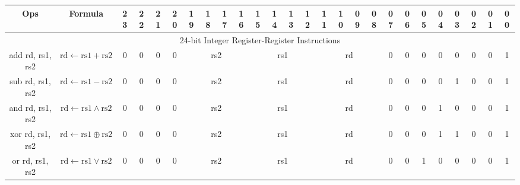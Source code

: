 \documentclass[a4paper,10pt]{article}
\begin{document}
\begin{landscape}\begin{longtable}[c]{|c|c|@{}c@{}|@{}c@{}|@{}c@{}|@{}c@{}|@{}c@{}|@{}c@{}|@{}c@{}|@{}c@{}|@{}c@{}|@{}c@{}|@{}c@{}|@{}c@{}|@{}c@{}|@{}c@{}|@{}c@{}|@{}c@{}|@{}c@{}|@{}c@{}|@{}c@{}|@{}c@{}|@{}c@{}|@{}c@{}|@{}c@{}|@{}c@{}|}\hline
Ops                   & Formula                                                            & 23  & 22  & 21  & 20  & 19      & 18      & 17     & 16    & 15       & 14     & 13     & 12    & 11     & 10   & 09    & 08    & 07                & 06                & 05   & 04   & 03   & 02 & 01 & 00 \\\hline


\hline
\multicolumn{26}{|c|}{24-bit Integer Register-Register Instructions}                                                                                                                                                                                                                                                             \\\hline
add rd, rs1, rs2      & $\mathrm{rd} \leftarrow \mathrm{rs1} + \mathrm{rs2}$ & 0 & 0 & 0 & 0 & \multicolumn{4}{c|}{rs2}            & \multicolumn{4}{c|}{rs1}            & \multicolumn{4}{c|}{rd}      & 0              & 0                & 0   & 0   & 0   & 0 & 0 & 1 \\
sub rd, rs1, rs2      & $\mathrm{rd} \leftarrow \mathrm{rs1} - \mathrm{rs2}$ & 0 & 0 & 0 & 0 & \multicolumn{4}{c|}{rs2}            & \multicolumn{4}{c|}{rs1}            & \multicolumn{4}{c|}{rd}      & 0              & 0                & 0   & 0   & 1   & 0 & 0 & 1 \\
and rd, rs1, rs2      & $\mathrm{rd} \leftarrow \mathrm{rs1} \land \mathrm{rs2}$ & 0 & 0 & 0 & 0 & \multicolumn{4}{c|}{rs2}            & \multicolumn{4}{c|}{rs1}            & \multicolumn{4}{c|}{rd}      & 0              & 0                & 0   & 1   & 0   & 0 & 0 & 1 \\
xor rd, rs1, rs2      & $\mathrm{rd} \leftarrow \mathrm{rs1} \oplus \mathrm{rs2}$ & 0 & 0 & 0 & 0 & \multicolumn{4}{c|}{rs2}            & \multicolumn{4}{c|}{rs1}            & \multicolumn{4}{c|}{rd}      & 0              & 0                & 0   & 1   & 1   & 0 & 0 & 1 \\
or rd, rs1, rs2       & $\mathrm{rd} \leftarrow \mathrm{rs1} \lor \mathrm{rs2}$ & 0 & 0 & 0 & 0 & \multicolumn{4}{c|}{rs2}            & \multicolumn{4}{c|}{rs1}            & \multicolumn{4}{c|}{rd}      & 0              & 0                & 1   & 0   & 0   & 0 & 0 & 1 \\

\end{longtable}
\end{landscape}
\end{document}
